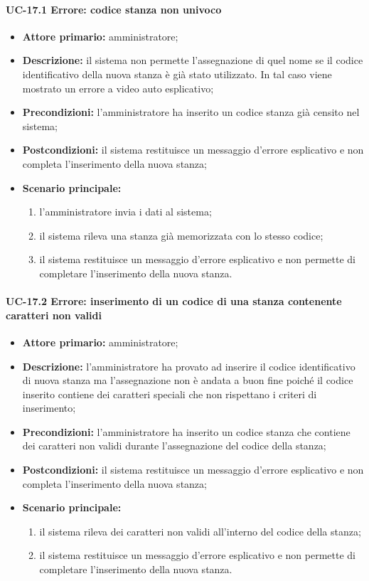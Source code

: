 \paragraph{UC-17.1 Errore: codice stanza non univoco}
\begin{itemize}
	\item \textbf{Attore primario:} amministratore;
	\item \textbf{Descrizione:} il sistema non permette l'assegnazione di quel nome se il codice identificativo della nuova stanza è già stato utilizzato. In tal caso viene mostrato un errore a video auto esplicativo;
	\item \textbf{Precondizioni:} l'amministratore ha inserito un codice stanza già censito nel sistema;
	\item \textbf{Postcondizioni:} il sistema restituisce un messaggio d'errore esplicativo e non completa l'inserimento della nuova stanza;
	\item \textbf{Scenario principale:}
	      \begin{enumerate}
	      	      \item l'amministratore invia i dati al sistema;
		      \item il sistema rileva una stanza già memorizzata con lo stesso codice;
		      \item il sistema restituisce un messaggio d'errore esplicativo e non permette di completare l'inserimento della nuova stanza.
	      \end{enumerate}
\end{itemize}
    
    
\paragraph{UC-17.2 Errore: inserimento di un codice di una stanza contenente caratteri non validi}
\begin{itemize}
	\item \textbf{Attore primario:} amministratore;
	\item \textbf{Descrizione:} l'amministratore ha provato ad inserire il codice identificativo di nuova stanza ma l'assegnazione non è andata a buon fine poiché il codice inserito contiene dei caratteri speciali che non rispettano i criteri di inserimento;
	\item \textbf{Precondizioni:} l'amministratore ha inserito un codice stanza che contiene dei caratteri non validi durante l'assegnazione del codice della stanza;
	\item \textbf{Postcondizioni:} il sistema restituisce un messaggio d'errore esplicativo e non completa l'inserimento della nuova stanza;
	\item \textbf{Scenario principale:}
	      \begin{enumerate}
		      \item il sistema rileva dei caratteri non validi all'interno del codice della stanza;
		      \item il sistema restituisce un messaggio d'errore esplicativo e non permette di completare l'inserimento della nuova stanza.
	      \end{enumerate}
\end{itemize}
 
